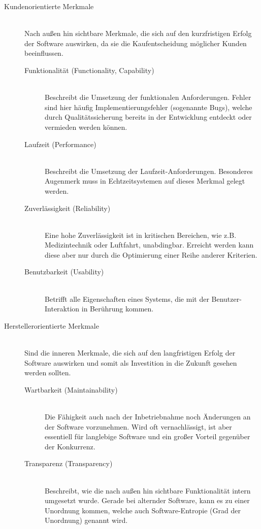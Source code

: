 \begin{description}
  \item[Kundenorientierte Merkmale] \hfill \\ Nach außen hin sichtbare Merkmale, die sich auf den kurzfristigen Erfolg der Software auswirken, da sie die Kaufentscheidung möglicher Kunden beeinflussen.
  \begin{description}
    \item[Funktionalität (Functionality, Capability)] \hfill \\ Beschreibt die Umsetzung der funktionalen Anforderungen. Fehler sind hier häufig Implementierungsfehler (sogenannte Bugs), welche durch Qualitätssicherung bereits in der Entwicklung entdeckt oder vermieden werden können. 
    \item[Laufzeit (Performance)] \hfill \\ Beschreibt die Umsetzung der Laufzeit-Anforderungen. Besonderes Augenmerk muss in Echtzeitsystemen auf dieses Merkmal gelegt werden.
    \item[Zuverlässigkeit (Reliability)] \hfill \\ Eine hohe Zuverlässigkeit ist in kritischen Bereichen, wie z.B. Medizintechnik oder Luftfahrt, unabdingbar. Erreicht werden kann diese aber nur durch die Optimierung einer Reihe anderer Kriterien.
    \item[Benutzbarkeit (Usability)] \hfill \\ Betrifft alle Eigenschaften eines Systems, die mit der Benutzer-Interaktion in Berührung kommen.
  \end{description}
  \item[Herstellerorientierte Merkmale] \hfill \\ Sind die inneren Merkmale, die sich auf den langfristigen Erfolg der Software auswirken und somit als Investition in die Zukunft gesehen werden sollten.
  \begin{description}
    \item[Wartbarkeit (Maintainability)] \hfill \\ Die Fähigkeit auch nach der Inbetriebnahme noch Änderungen an der Software vorzunehmen. Wird oft vernachlässigt, ist aber essentiell für langlebige Software und ein großer Vorteil gegenüber der Konkurrenz.
    \item[Transparenz (Transparency)] \hfill \\ Beschreibt, wie die nach außen hin sichtbare Funktionalität intern umgesetzt wurde. Gerade bei alternder Software, kann es zu einer Unordnung kommen, welche auch Software-Entropie (Grad der Unordnung) genannt wird.

\end{description}
\end{description}
